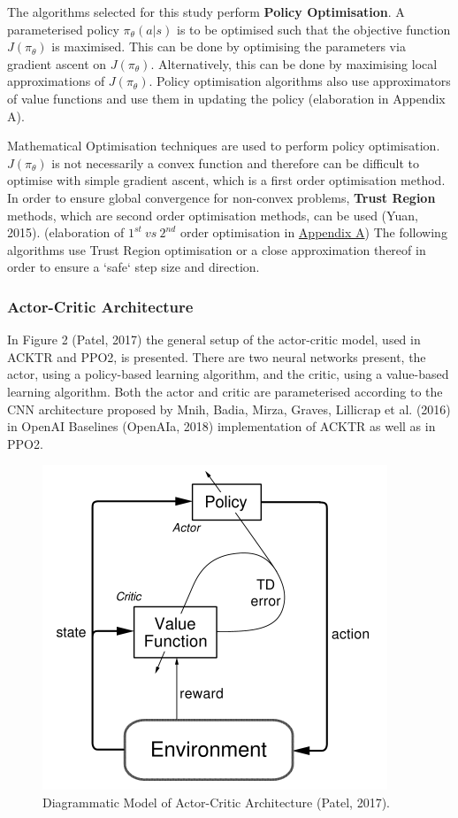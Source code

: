 The algorithms selected for this study perform \textbf{Policy Optimisation}. A parameterised policy $\pi_{\theta}(a|s) $ is to be optimised such that the objective function $J(\pi_{\theta})$ is maximised. This can be done by optimising the parameters via gradient ascent on $J(\pi_{\theta})$. Alternatively, this can be done by maximising local approximations of $J(\pi_{\theta})$. Policy optimisation algorithms also use approximators of value functions and use them in updating the policy (elaboration in Appendix A).

Mathematical Optimisation techniques are used to perform policy optimisation. $J(\pi_{\theta})$ is not necessarily a convex function and therefore can be difficult to optimise with simple gradient ascent, which is a first order optimisation method. In order to ensure global convergence for non-convex problems, \textbf{Trust Region} methods, which are second order optimisation methods, can be used (Yuan, 2015). (elaboration of $1^{st} \ vs \ 2^{nd}$ order optimisation in \hyperref[sec:appx]{Appendix A})
The following algorithms use Trust Region optimisation or a close approximation thereof in order to ensure a `safe` step size and direction.  


\subsubsection*{Actor-Critic Architecture}
In Figure 2 (Patel, 2017) the general setup of the actor-critic model, used in ACKTR and PPO2, is presented. There are two neural networks present, the actor, using a policy-based learning algorithm, and the critic, using a value-based learning algorithm. Both the actor and critic are parameterised according to the CNN architecture proposed by Mnih, Badia, Mirza, Graves, Lillicrap et al. (2016) in OpenAI Baselines (OpenAIa, 2018) implementation of ACKTR as well as in PPO2.

\begin{figure}[t]
	\includegraphics[width=\columnwidth]{fig2.png} 
	\caption{Diagrammatic Model of Actor-Critic Architecture (Patel, 2017).}
\end{figure}

